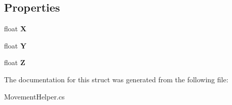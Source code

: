 \subsection*{Properties}
\begin{DoxyCompactItemize}
\item 
\hypertarget{structffxivlib_1_1_movement_helper_1_1_coords_ae7bfa9963f0d99c29b068a675013056c}{float {\bfseries X}}\label{structffxivlib_1_1_movement_helper_1_1_coords_ae7bfa9963f0d99c29b068a675013056c}

\item 
\hypertarget{structffxivlib_1_1_movement_helper_1_1_coords_a62cee2c7af4fbeeecff74b69662483b1}{float {\bfseries Y}}\label{structffxivlib_1_1_movement_helper_1_1_coords_a62cee2c7af4fbeeecff74b69662483b1}

\item 
\hypertarget{structffxivlib_1_1_movement_helper_1_1_coords_a020622622fcb819fbf722669ce45ef9c}{float {\bfseries Z}}\label{structffxivlib_1_1_movement_helper_1_1_coords_a020622622fcb819fbf722669ce45ef9c}

\end{DoxyCompactItemize}


The documentation for this struct was generated from the following file\-:\begin{DoxyCompactItemize}
\item 
Movement\-Helper.\-cs\end{DoxyCompactItemize}
